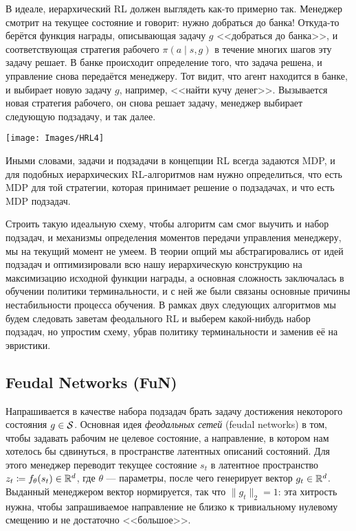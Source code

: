 \begin{example}
В идеале, иерархический RL должен выглядеть как-то примерно так. Менеджер смотрит на текущее состояние и говорит: нужно добраться до банка! Откуда-то берётся функция награды, описывающая задачу $g$ <<добраться до банка>>, и соответствующая стратегия рабочего $\pi(a \mid s, g)$ в течение многих шагов эту задачу решает. В банке происходит определение того, что задача решена, и управление снова передаётся менеджеру. Тот видит, что агент находится в банке, и выбирает новую задачу $g$, например, <<найти кучу денег>>. Вызывается новая стратегия рабочего, он снова решает задачу, менеджер выбирает следующую подзадачу, и так далее.

\begin{center}
    \texttt{[image: Images/HRL4]}
\end{center}
\end{example}

Иными словами, задачи и подзадачи в концепции RL всегда задаются MDP, и для подобных иерархических RL-алгоритмов нам нужно определиться, что есть MDP для той стратегии, которая принимает решение о подзадачах, и что есть MDP подзадач.

Строить такую идеальную схему, чтобы алгоритм сам смог выучить и набор подзадач, и механизмы определения моментов передачи управления менеджеру, мы на текущий момент не умеем. В теории опций мы абстрагировались от идей подзадач и оптимизировали всю нашу иерархическую конструкцию на максимизацию исходной функции награды, а основная сложность заключалась в обучении политики терминальности, и с ней же были связаны основные причины нестабильности процесса обучения. В рамках двух следующих алгоритмов мы будем следовать заветам феодального RL и выберем какой-нибудь набор подзадач, но упростим схему, убрав политику терминальности и заменив её на эвристики.

\subsection{Feudal Networks (FuN)}

Напрашивается в качестве набора подзадач брать задачу достижения некоторого состояния $g \in \mathcal{S}$. Основная идея \emph{феодальных сетей} (feudal networks) в том, чтобы задавать рабочим не целевое состояние, а направление, в котором нам хотелось бы сдвинуться, в пространстве латентных описаний состояний. Для этого менеджер переводит текущее состояние $s_t$ в латентное пространство $z_t \coloneqq f_\theta(s_t) \in \mathbb{R}^d$, где $\theta$ --- параметры, после чего генерирует вектор $g_t \in \mathbb{R}^d$. Выданный менеджером вектор нормируется, так что $\|g_t\|_2 = 1$: эта хитрость нужна, чтобы запрашиваемое направление не близко к тривиальному нулевому смещению и не достаточно <<большое>>.

